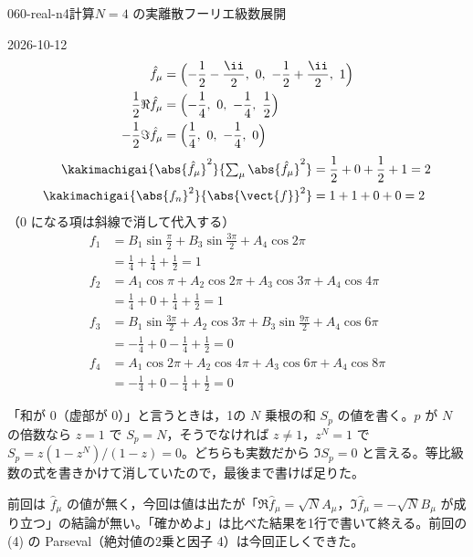 \documentclass[uplatex,dvipdfmx,a4paper,11pt]{jsarticle}
\begin{document}
\begin{mondai}{060-real-n4}{計算}{$N=4$ の実離散フーリエ級数展開}
\begin{kotaeutsushi}{2026-10-12}
\[\]
\begin{align*}
  \hat{f}_{\mu}&=\Bigl(-\frac{1}{2}-\frac{\ii}{2},\ 0,\ -\frac{1}{2}+\frac{\ii}{2},\ 1\Bigr)\\
  \frac{1}{2}\Re\hat{f}_{\mu}&=\Bigl(-\frac{1}{4},\ 0,\ -\frac{1}{4},\ \frac{1}{2}\Bigr)\\
  -\frac{1}{2}\Im\hat{f}_{\mu}&=\Bigl(\frac{1}{4},\ 0,\ -\frac{1}{4},\ 0\Bigr)
\end{align*}
\begin{align*}
  \kakimachigai{\abs{\hat{f}_{\mu}}^{2}}{\textstyle\sum_{\mu}\abs{\hat{f}_{\mu}}^{2}}&=\frac{1}{2}+0+\frac{1}{2}+1=2\\
  \kakimachigai{\abs{f_n}^{2}}{\abs{\vect{f}}^{2}}&=1+1+0+0=2
\end{align*}
（0 になる項は斜線で消して代入する）
\begin{align*}
  f_1&=B_1\sin\frac{\pi}{2}+B_3\sin\frac{3\pi}{2}+A_4\cos2\pi\\
  &=\frac{1}{4}+\frac{1}{4}+\frac{1}{2}=1\\
  f_2&=A_1\cos\pi+A_2\cos2\pi+A_3\cos3\pi+A_4\cos4\pi\\
  &=\frac{1}{4}+0+\frac{1}{4}+\frac{1}{2}=1\\
  f_3&=B_1\sin\frac{3\pi}{2}+A_2\cos3\pi+B_3\sin\frac{9\pi}{2}+A_4\cos6\pi\\
  &=-\frac{1}{4}+0-\frac{1}{4}+\frac{1}{2}=0\\
  f_4&=A_1\cos2\pi+A_2\cos4\pi+A_3\cos6\pi+A_4\cos8\pi\\
  &=-\frac{1}{4}+0-\frac{1}{4}+\frac{1}{2}=0
\end{align*}
\end{kotaeutsushi}
\begin{kizuki}
\item {} 「和が 0（虚部が 0）」と言うときは，1の $N$ 乗根の和 $S_p$ の値を書く。$p$ が $N$ の倍数なら $z=1$ で $S_p=N$，そうでなければ $z\neq1$，$z^{N}=1$ で $S_p=z(1-z^{N})/(1-z)=0$。どちらも実数だから $\Im S_p=0$ と言える。等比級数の式を書きかけて消していたので，最後まで書けば足りた。
\item {} 前回は $\hat{f}_{\mu}$ の値が無く，今回は値は出たが「$\Re\hat{f}_{\mu}=\sqrt{N}A_{\mu}$，$\Im\hat{f}_{\mu}=-\sqrt{N}B_{\mu}$ が成り立つ」の結論が無い。「確かめよ」は比べた結果を1行で書いて終える。前回の (4) の Parseval（絶対値の2乗と因子 4）は今回正しくできた。

\end{kizuki}
\end{mondai}
\end{document}
